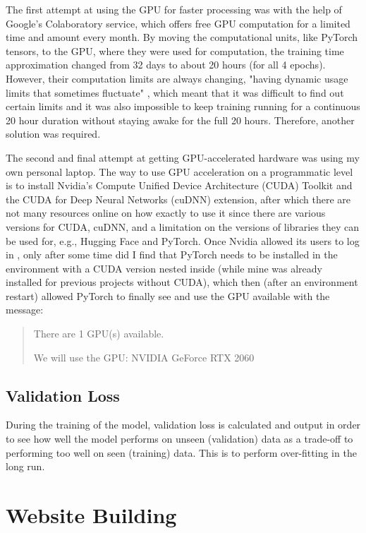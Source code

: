 \documentclass{l4proj}
\begin{document}
The first attempt at using the GPU for faster processing was with the help of Google's Colaboratory service, which offers free GPU computation for a limited time and amount every month. By moving the computational units, like PyTorch tensors, to the GPU, where they were used for computation, the training time approximation changed from 32 days to about 20 hours (for all 4 epochs). However, their computation limits are always changing, "having dynamic usage limits that sometimes fluctuate" \citep{ColabFAQ}, which meant that it was difficult to find out certain limits and it was also impossible to keep training running for a continuous 20 hour duration without staying awake for the full 20 hours. Therefore, another solution was required.

The second and final attempt at getting GPU-accelerated hardware was using my own personal laptop. The way to use GPU acceleration on a programmatic level is to install Nvidia's Compute Unified Device Architecture (CUDA) Toolkit and the CUDA for Deep Neural Networks (cuDNN) extension, after which there are not many resources online on how exactly to use it since there are various versions for CUDA, cuDNN, and a limitation on the versions of libraries they can be used for, e.g., Hugging Face and PyTorch. Once Nvidia allowed its users to log in \citep{NvidiaLogIn}, only after some time did I find that PyTorch needs to be installed in the environment with a CUDA version nested inside (while mine was already installed for previous projects without CUDA), which then (after an environment restart) allowed PyTorch to finally see and use the GPU available with the message:

\begin{quote}
    There are 1 GPU(s) available.
    
    We will use the GPU: NVIDIA GeForce RTX 2060
\end{quote}

\subsection{Validation Loss}

During the training of the model, validation loss is calculated and output in order to see how well the model performs on unseen (validation) data as a trade-off to performing too well on seen (training) data. This is to perform over-fitting in the long run.

\section{Website Building}
\label{sec:imp_web}
\end{document}
